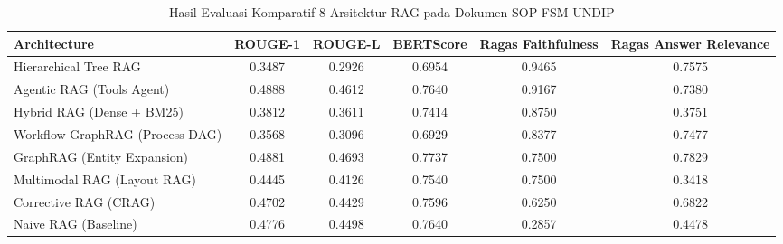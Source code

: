 \begin{table}
\caption{Hasil Evaluasi Komparatif 8 Arsitektur RAG pada Dokumen SOP FSM UNDIP}
\label{tab:rag_benchmark_master}
\begin{tabular}{lccccc}
\toprule
Architecture & ROUGE-1 & ROUGE-L & BERTScore & Ragas Faithfulness & Ragas Answer Relevance \\
\midrule
Hierarchical Tree RAG & 0.3487 & 0.2926 & 0.6954 & 0.9465 & 0.7575 \\
Agentic RAG (Tools Agent) & 0.4888 & 0.4612 & 0.7640 & 0.9167 & 0.7380 \\
Hybrid RAG (Dense + BM25) & 0.3812 & 0.3611 & 0.7414 & 0.8750 & 0.3751 \\
Workflow GraphRAG (Process DAG) & 0.3568 & 0.3096 & 0.6929 & 0.8377 & 0.7477 \\
GraphRAG (Entity Expansion) & 0.4881 & 0.4693 & 0.7737 & 0.7500 & 0.7829 \\
Multimodal RAG (Layout RAG) & 0.4445 & 0.4126 & 0.7540 & 0.7500 & 0.3418 \\
Corrective RAG (CRAG) & 0.4702 & 0.4429 & 0.7596 & 0.6250 & 0.6822 \\
Naive RAG (Baseline) & 0.4776 & 0.4498 & 0.7640 & 0.2857 & 0.4478 \\
\bottomrule
\end{tabular}
\end{table}
